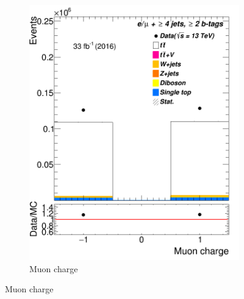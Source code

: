 \begin{figure}
\begin{subfigure}{0.25\textwidth}
		\includegraphics[width=\linewidth]{ControlPlots_emujets_2016_4incl_2incl/mu_charge_emujets_2016.png}
		\caption{Muon charge} \label{fig:a2}
	\end{subfigure}



\end{figure}
